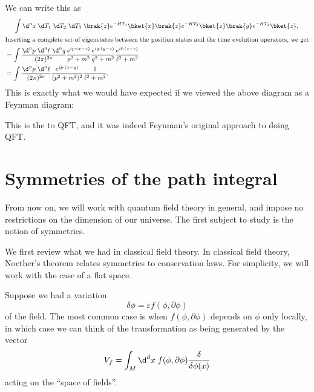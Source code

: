 \documentclass[a4paper]{article}
\begin{document}
We can write this as
\begin{align*}
  &\hphantom{{}={}} \int \d^n z \; \d T_1 \;\d T_2 \;\d T_3\; \brak{z} e^{-HT_1} \bket{x} \brak{z}e^{-HT_2} \bket{z} \brak{y} e^{-H T_3} \bket{z}.\\
  \intertext{Inserting a complete set of eigenstates between the position states and the time evolution operators, we get}
  &= \int \frac{\d^n p\; \d^n \ell\;\d^n q}{(2\pi)^{3n}} \frac{e^{ip\cdot(x - z)}}{p^2 + m^2} \frac{e^{iq\cdot(y - z)}}{q^2 + m^2} \frac{e^{i\ell\cdot(z - z)}}{\ell^2 + m^2}\\
  &= \int \frac{\d^n p\; \d^n \ell}{(2\pi)^{2n}} \frac{e^{ip\cdot (x - y)}}{(p^2 + m^2)^2} \frac{1}{\ell^2 + m^2}.
\end{align*}
This is exactly what we would have expected if we viewed the above diagram as a Feynman diagram:
\begin{center}
\end{center}
This is the  to QFT, and it was indeed Feynman's original approach to doing QFT.

\section{Symmetries of the path integral}
From now on, we will work with quantum field theory in general, and impose no restrictions on the dimension of our universe. The first subject to study is the notion of symmetries.

We first review what we had in classical field theory. In classical field theory, Noether's theorem relates symmetries to conservation laws. For simplicity, we will work with the case of a flat space.

Suppose we had a variation
\[
  \delta \phi = \varepsilon f(\phi, \partial \phi)
\]
of the field. The most common case is when $f(\phi, \partial \phi)$ depends on $\phi$ only locally, in which case we can think of the transformation as being generated by the vector
\[
  V_f = \int_M \d^d x \; f(\phi, \partial \phi) \frac{\delta}{\delta \phi(x)}
\]
acting on the ``space of fields''.
\end{document}
